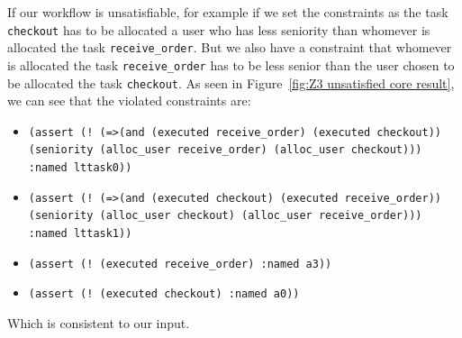 \documentclass[a4paper]{report}
\begin{document}
If our workflow is unsatisfiable, for example if we set the constraints as the task \texttt{checkout} has to be allocated a user who has less seniority than whomever is allocated the task \texttt{receive\_order}. But we also have a constraint that whomever is allocated the task \texttt{receive\_order} has to be less senior than the user chosen to be allocated the task \texttt{checkout}. As seen in Figure~\ref{fig:Z3 unsatisfied core result}, we can see that the violated constraints are:
\begin{itemize}
\item  \texttt{(assert (! (=>(and (executed receive\_order) (executed checkout))\\
(seniority (alloc\_user receive\_order) (alloc\_user checkout)))\\
:named lttask0))}
\item \texttt{(assert (! (=>(and (executed checkout) (executed receive\_order))\\
(seniority (alloc\_user checkout) (alloc\_user receive\_order))) \\
:named lttask1))}
\item \texttt{(assert (! (executed receive\_order) :named a3))}
\item \texttt{(assert (! (executed checkout) :named a0))}
\end{itemize}
Which is consistent to our input.
\end{document}
